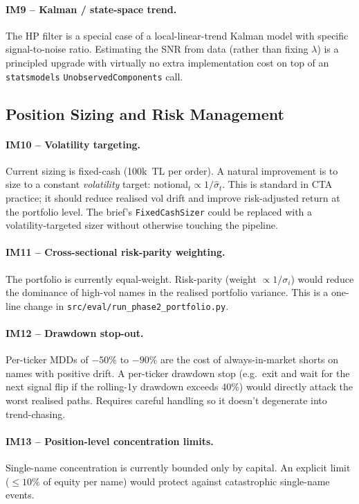 \documentclass[11pt,a4paper]{article}
\begin{document}
\paragraph{IM9 -- Kalman / state-space trend.} The HP filter is a special case
of a local-linear-trend Kalman model with specific signal-to-noise ratio.
Estimating the SNR from data (rather than fixing $\lambda$) is a principled
upgrade with virtually no extra implementation cost on top of an
\texttt{statsmodels} \texttt{UnobservedComponents} call.

\subsection{Position Sizing and Risk Management}

\paragraph{IM10 -- Volatility targeting.} Current sizing is fixed-cash
(100k~TL per order). A natural improvement is to size to a constant
\emph{volatility} target: $\text{notional}_t \propto 1/\hat{\sigma}_t$. This
is standard in CTA practice; it should reduce realised vol drift and improve
risk-adjusted return at the portfolio level. The brief's
\texttt{FixedCashSizer} could be replaced with a volatility-targeted sizer
without otherwise touching the pipeline.

\paragraph{IM11 -- Cross-sectional risk-parity weighting.} The portfolio is
currently equal-weight. Risk-parity (weight $\propto 1/\sigma_i$) would
reduce the dominance of high-vol names in the realised portfolio variance.
This is a one-line change in
\texttt{src/eval/run\_phase2\_portfolio.py}.

\paragraph{IM12 -- Drawdown stop-out.} Per-ticker MDDs of $-50\%$ to $-90\%$
are the cost of always-in-market shorts on names with positive drift. A
per-ticker drawdown stop (e.g.\ exit and wait for the next signal flip if
the rolling-1y drawdown exceeds 40\%) would directly attack the worst
realised paths. Requires careful handling so it doesn't degenerate into
trend-chasing.

\paragraph{IM13 -- Position-level concentration limits.} Single-name
concentration is currently bounded only by capital. An explicit limit
($\le 10\%$ of equity per name) would protect against catastrophic single-name
events.
\end{document}
